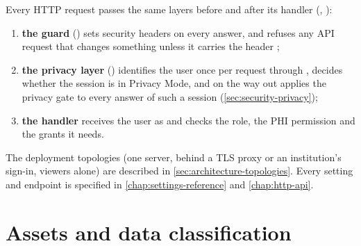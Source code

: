 Every HTTP request passes the same layers before and after its handler (,
):
\begin{enumerate}
\item \textbf{the guard} () sets security headers on every answer, and refuses any
  API request that changes something unless it carries the header ;
\item \textbf{the privacy layer} () identifies the user once per request through
  , decides whether the session is in Privacy Mode, and on the way out
  applies the privacy gate to every answer of such a session (\cref{sec:security-privacy});
\item \textbf{the handler} receives the user as  and checks the role, the PHI
  permission and the grants it needs.
\end{enumerate}
The deployment topologies (one server, behind a TLS proxy or an institution's sign-in, viewers
alone) are described in \cref{sec:architecture-topologies}. Every
setting and endpoint is specified in \cref{chap:settings-reference} and \cref{chap:http-api}.

\section{Assets and data classification}
\label{sec:security-assets}

